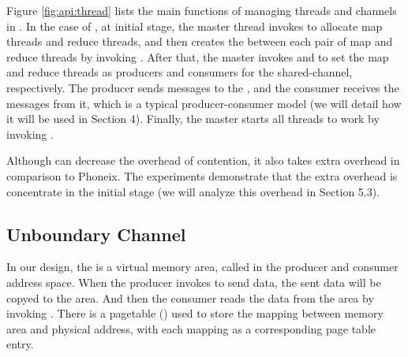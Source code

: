 Figure \ref{fig:api:thread} lists the main functions of managing threads and channels in \myth.
In the case of \myds, at initial stage, the master thread invokes  to allocate map threads and reduce threads, and then creates the \chan  between each pair of map and reduce threads by invoking .
After that, the master invokes  and  to set the map and reduce threads as producers and consumers for the shared-channel, respectively.
The producer sends messages to the \chan, and the consumer receives the messages from it,
which is a typical producer-consumer model (we will detail how it will be used in Section 4). 
Finally, the master starts all threads to work by invoking .

Although \myth can decrease the overhead of contention,
it also takes extra overhead in comparison to Phoneix. The experiments demonstrate that the extra overhead 
is concentrate in the initial stage (we will analyze this overhead in Section 5.3). 


\subsection{Unboundary Channel}
In our design, the \chan is a virtual memory area, called  in the producer and consumer address space.
When the producer invokes  to send data, the sent data will be copyed to the  area.
And then the consumer reads the data from the  area  by invoking .
There is a pagetable () used to store the mapping between  memory area and physical address, with each mapping as a corresponding page table entry.



